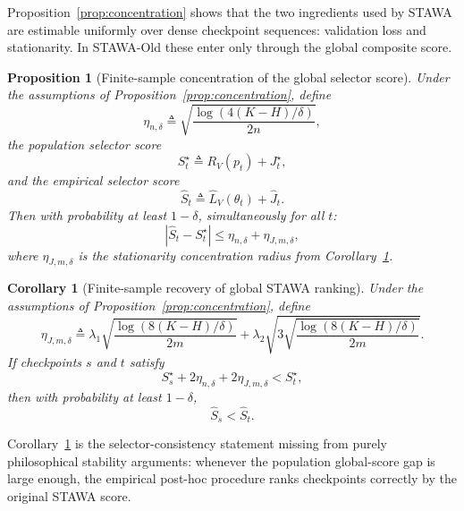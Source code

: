 \documentclass{article}
\newtheorem{proposition}{Proposition}
\newtheorem{corollary}{Corollary}
\newcommand{\stawa}{\textup{\textsc{STAWA}}}
\begin{document}
Proposition~\ref{prop:concentration} shows that the two ingredients used by \stawa{} are estimable uniformly over dense checkpoint sequences: validation loss and stationarity. In STAWA-Old these enter only through the global composite score.

\begin{proposition}[Finite-sample concentration of the global selector score]
\label{prop:plateau_membership}
Under the assumptions of Proposition~\ref{prop:concentration}, define
\begin{equation}
    \eta_{n,\delta}
    \triangleq
    \sqrt{\frac{\log(4(K-H)/\delta)}{2n}},
\end{equation}
the population selector score
\begin{equation}
    S_t^\star \triangleq R_V(p_t) + J_t^\star,
\end{equation}
and the empirical selector score
\begin{equation}
    \hat S_t
    \triangleq
    \hat L_V(\theta_t) + \hat J_t.
\end{equation}
Then with probability at least $1-\delta$, simultaneously for all $t$:
\begin{equation}
    \left|\hat S_t - S_t^\star\right|
    \le
    \eta_{n,\delta} + \eta_{J,m,\delta},
\end{equation}
where $\eta_{J,m,\delta}$ is the stationarity concentration radius from Corollary~\ref{cor:ranking}.
\end{proposition}

\begin{corollary}[Finite-sample recovery of global STAWA ranking]
\label{cor:ranking}
Under the assumptions of Proposition~\ref{prop:concentration}, define
\begin{equation}
    \eta_{J,m,\delta}
    \triangleq
    \lambda_1 \sqrt{\frac{\log(8(K-H)/\delta)}{2m}}
    +
    \lambda_2 \sqrt{
        3\sqrt{\frac{\log(8(K-H)/\delta)}{2m}}
    }.
\end{equation}
If checkpoints $s$ and $t$ satisfy
\begin{equation}
    S_s^\star + 2\eta_{n,\delta} + 2\eta_{J,m,\delta} < S_t^\star,
\end{equation}
then with probability at least $1-\delta$,
\begin{equation}
    \hat S_s < \hat S_t.
\end{equation}
\end{corollary}

Corollary~\ref{cor:ranking} is the selector-consistency statement missing from purely philosophical stability arguments: whenever the population global-score gap is large enough, the empirical post-hoc procedure ranks checkpoints correctly by the original STAWA score.
\end{document}
